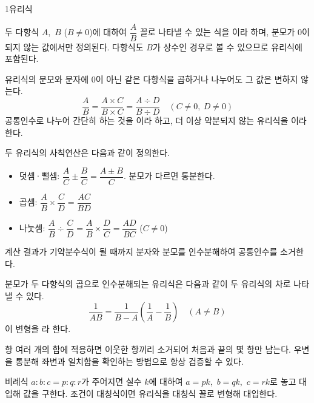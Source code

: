 \documentclass[10pt]{article}
\begin{document}

\begin{dmconcept}{1}{유리식}
\setlength{\parskip}{1.4mm plus 1.6mm minus 0mm}\linespread{1.22}\selectfont%


두 다항식 $A$,\ $B$ ($B \ne 0$)에 대하여 $\dfrac{A}{B}$ 꼴로 나타낼 수 있는 식을 이라 하며, 분모가 $0$이 되지 않는 값에서만 정의된다. 다항식도 $B$가 상수인 경우로 볼 수 있으므로 유리식에 포함된다.

유리식의 분모와 분자에 $0$이 아닌 같은 다항식을 곱하거나 나누어도 그 값은 변하지 않는다.
\begin{equation*}
  \frac{A}{B} = \frac{A \times C}{B \times C} = \frac{A \div D}{B \div D} \quad (C \ne 0,\ D \ne 0)
\end{equation*}
공통인수로 나누어 간단히 하는 것을 이라 하고, 더 이상 약분되지 않는 유리식을 이라 한다.


두 유리식의 사칙연산은 다음과 같이 정의한다.
\begin{itemize}[leftmargin=8mm, itemsep=0.5mm, topsep=1mm]
  \item 덧셈·뺄셈: $\dfrac{A}{C} \pm \dfrac{B}{C} = \dfrac{A \pm B}{C}$. 분모가 다르면 통분한다.
  \item 곱셈: $\dfrac{A}{B} \times \dfrac{C}{D} = \dfrac{AC}{BD}$
  \item 나눗셈: $\dfrac{A}{B} \div \dfrac{C}{D} = \dfrac{A}{B} \times \dfrac{D}{C} = \dfrac{AD}{BC}$ ($C \ne 0$)
\end{itemize}
계산 결과가 기약분수식이 될 때까지 분자와 분모를 인수분해하여 공통인수를 소거한다.


분모가 두 다항식의 곱으로 인수분해되는 유리식은 다음과 같이 두 유리식의 차로 나타낼 수 있다.
\begin{equation*}
  \frac{1}{AB} = \frac{1}{B - A}\left(\frac{1}{A} - \frac{1}{B}\right) \quad (A \ne B)
\end{equation*}
이 변형을 라 한다.

항 여러 개의 합에 적용하면 이웃한 항끼리 소거되어 처음과 끝의 몇 항만 남는다. 우변을 통분해 좌변과 일치함을 확인하는 방법으로 항상 검증할 수 있다.


비례식 $a : b : c = p : q : r$가 주어지면 실수 $k$에 대하여 $a = pk$,\ $b = qk$,\ $c = rk$로 놓고 대입해 값을 구한다. 조건이 대칭식이면 유리식을 대칭식 꼴로 변형해 대입한다.

\end{dmconcept}
\end{document}
